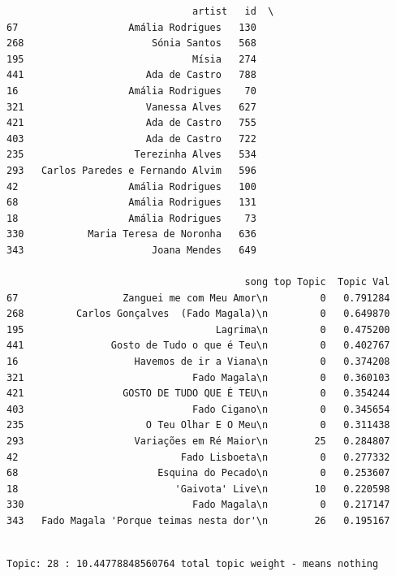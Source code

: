 \documentclass[11pt]{article}
\begin{document}
    
    \begin{verbatim}
                                artist   id  \
67                   Amália Rodrigues   130   
268                      Sónia Santos   568   
195                             Mísia   274   
441                     Ada de Castro   788   
16                   Amália Rodrigues    70   
321                     Vanessa Alves   627   
421                     Ada de Castro   755   
403                     Ada de Castro   722   
235                   Terezinha Alves   534   
293   Carlos Paredes e Fernando Alvim   596   
42                   Amália Rodrigues   100   
68                   Amália Rodrigues   131   
18                   Amália Rodrigues    73   
330           Maria Teresa de Noronha   636   
343                      Joana Mendes   649   

                                         song top Topic  Topic Val  
67                  Zanguei me com Meu Amor\n         0   0.791284  
268         Carlos Gonçalves  (Fado Magala)\n         0   0.649870  
195                                 Lagrima\n         0   0.475200  
441               Gosto de Tudo o que é Teu\n         0   0.402767  
16                    Havemos de ir a Viana\n         0   0.374208  
321                             Fado Magala\n         0   0.360103  
421                 GOSTO DE TUDO QUE É TEU\n         0   0.354244  
403                             Fado Cigano\n         0   0.345654  
235                     O Teu Olhar E O Meu\n         0   0.311438  
293                   Variações em Ré Maior\n        25   0.284807  
42                            Fado Lisboeta\n         0   0.277332  
68                        Esquina do Pecado\n         0   0.253607  
18                           'Gaivota' Live\n        10   0.220598  
330                             Fado Magala\n         0   0.217147  
343   Fado Magala 'Porque teimas nesta dor'\n        26   0.195167  
    \end{verbatim}

    
    \begin{Verbatim}[commandchars=\\\{\}]

Topic: 28 : 10.44778848560764 total topic weight - means nothing

    \end{Verbatim}
\end{document}
